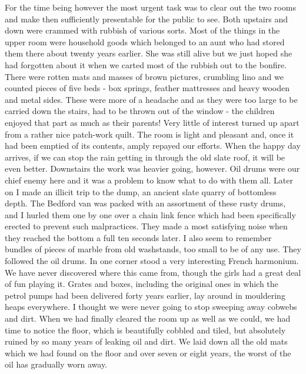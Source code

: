 For the time being however the most urgent task was to clear out the two rooms and make then sufficiently presentable for the public to see. Both upstairs and down were crammed with rubbish of various sorts. Most of the things in the upper room were household goods which belonged to an aunt who had stored them there about twenty years earlier. She was still alive but we just hoped she had forgotten about it when we carted most of the rubbish out to the bonfire. There were rotten mats and masses of brown pictures, crumbling lino and we counted pieces of five beds - box springs, feather mattresses and heavy wooden and metal sides. These were more of a headache and as they were too large to be carried down the stairs, had to be thrown out of the window - the children enjoyed that part as much as their parents! Very little of interest turned up apart from a rather nice patch-work quilt. The room is light and pleasant and, once it had been emptied of its contents, amply repayed our efforts. When the happy day arrives, if we can stop the rain getting in through the old slate roof, it will be even better. Downstairs the work was heavier going, however. Oil drums were our chief enemy here and it was a problem to know what to do with them all. Later on I made an illicit trip to the dump, an ancient slate quarry of bottomless depth. The Bedford van was packed with an assortment of these rusty drums, and I hurled them one by one over a chain link fence which had been specifically erected to prevent such malpractices. They made a most satisfying noise when they reached the bottom a full ten seconds later. I also seem to remember bundles of pieces of marble from old washstands, too small to be of any use. They followed the oil drums. In one corner stood a very interesting French harmonium. We have never discovered where this came from, though the girls had a great deal of fun playing it. Grates and boxes, including the original ones in which the petrol pumps had been delivered forty years earlier, lay around in mouldering heaps everywhere. I thought we were never going to stop sweeping away cobwebs and dirt. When we had finally cleared the room up as well as we could, we had time to notice the floor, which is beautifully cobbled and tiled, but absolutely ruined by so many years of leaking oil and dirt. We laid down all the old mats which we had found on the floor and over seven or eight years, the worst of the oil has gradually worn away.

